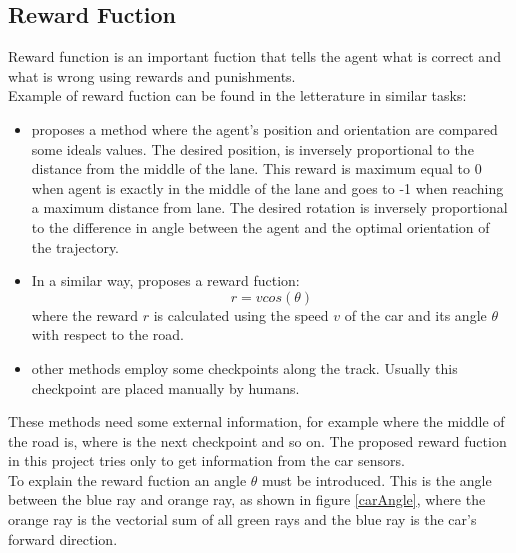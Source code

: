 \documentclass[14pt]{extarticle}
\def\sp{\vspace{5pt}}
\def\pp{\vspace{10pt}\newline}
\begin{document}
\begin{flushleft}
	\subsection{Reward Fuction} \label{rewardfuc}
	\sp
	Reward function is an important fuction that tells the agent what is correct and what is wrong using rewards and punishments. \\
	Example of reward fuction can be found in the letterature in similar tasks:
	\begin{itemize}
	\item \cite{Paper1} proposes a method where the agent's position and orientation are compared some ideals values. The desired position, is inversely proportional to the distance from the middle of the lane. This reward is maximum equal to 0 when agent is exactly in the middle of the lane and goes to -1 when reaching a maximum distance from lane. The desired rotation is inversely proportional to the difference in angle between the agent and the optimal orientation of the trajectory.
	\item In a similar way, \cite{Paper2} proposes a reward fuction:
	\[
	 r = v cos(\theta)
	\]
	where the reward $r$ is calculated using the speed $v$ of the car and its angle $\theta$ with respect to the road.
	\item other methods employ some checkpoints along the track. Usually this checkpoint are placed manually by humans.
	\end{itemize}
	These methods need some external information, for example where the middle of the road is, where is the next checkpoint and so on.
	\pp 
	The proposed reward fuction in this project tries only to get information from the car sensors. \\
To explain the reward fuction an angle $\theta$ must be introduced. This is the angle between the blue ray and orange ray, as shown in figure \ref{carAngle}, where the orange ray is the vectorial sum of all green rays and the blue ray is the car's forward direction.


\end{flushleft}
\end{document}
